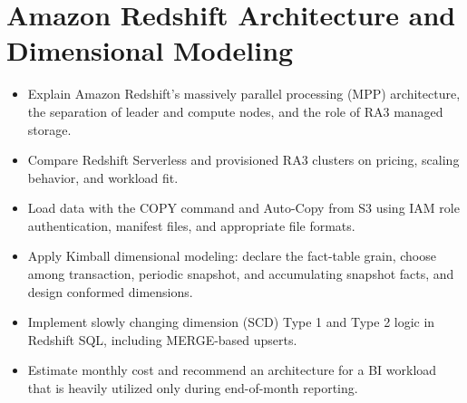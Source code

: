\chapter{Amazon Redshift Architecture and Dimensional Modeling}
%
\begin{objectives}
\begin{itemize}
    \item Explain Amazon Redshift's massively parallel processing (MPP) architecture, the separation of leader and compute nodes, and the role of RA3 managed storage.
    \item Compare Redshift Serverless and provisioned RA3 clusters on pricing, scaling behavior, and workload fit.
    \item Load data with the COPY command and Auto-Copy from S3 using IAM role authentication, manifest files, and appropriate file formats.
    \item Apply Kimball dimensional modeling: declare the fact-table grain, choose among transaction, periodic snapshot, and accumulating snapshot facts, and design conformed dimensions.
    \item Implement slowly changing dimension (SCD) Type 1 and Type 2 logic in Redshift SQL, including MERGE-based upserts.
    \item Estimate monthly cost and recommend an architecture for a BI workload that is heavily utilized only during end-of-month reporting.
\end{itemize}
\end{objectives}


